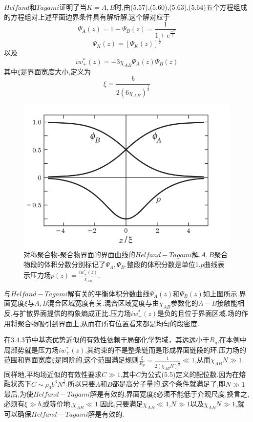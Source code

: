$Helfand$和$Tagami$证明了当$K=A,B$时,由(5.57),(5.60),(5.63),(5.64)五个方程组成的方程组对上述平面边界条件具有解析解,这个解对应于
\begin{equation}
\Psi_{A}(z)=1-\Psi_{B}(z)=\frac{1}{1+e^{\frac{-z}{\xi}}}
\end{equation}
\begin{equation}
\Psi_K(z) = [\Psi_K(z)]^{\frac{1}{2}}
\end{equation}
以及
\begin{equation}
iw_+^*(z)=-3\chi_{AB}\Psi_{A}(z)\Psi_{B}(z)
\end{equation}
其中$\xi$是界面宽度大小,定义为
\begin{equation}
\xi = \frac{b}{2(6\chi_{AB})^{\frac{1}{2}}}
\end{equation}
\begin{figure}[H]
	\centering
	\includegraphics[width=12cm]{./figures/fig5-4.png}
	\caption{对称聚合物-聚合物界面的界面曲线的$Helfand−Tagami$解.$A,B$聚合物段的体积分数分别标记了$\Psi_{A},\Psi_{B}$.整段的体积分数是单位1.$p$曲线表示压力场$p(z)=\frac{iw_+^*(z)}{\chi_{AB}}$.}
\end{figure}

与$Helfand−Tagami$解有关的平衡体积分数曲线$\Psi_{A}(z)$和$\Psi_{B}(z)$如上图所示.界面宽度$\xi$与$A,B$混合区域宽度有关.混合区域宽度与由$\chi_{AB}$参数化的$A−B$接触能相反,与扩散界面提供的构象熵成正比.压力场$iw_+^*(z)$是负的且位于界面区域.场的作用将聚合物吸引到界面上,从而在所有位置看来都是均匀的段密度.

在3.4.3节中基态优势近似的有效性依赖于局部化学势域，其远远小于$R_g$,在本例中局部势就是压力场$iw_+^*(z)$,其约束的不是整条链而是形成界面链段的环.压力场的范围和界面宽度$\xi$是同阶的,这个范围满足规则$\frac{\xi}{R_g} =\frac{1}{2(\chi_{AB}N)^{\frac{1}{2}}}\ll1$,从而$\chi_{AB}N\gg1$.同样地,平均场近似的有效性要求$C\gg1$,其中$C$为公式(5.5)定义的配位数.因为在熔融状态下$C\sim\rho_0b^3N^{\frac{1}{2}}$,所以只要$A$和$B$都是高分子量的,这个条件就满足了,即$N\gg1$.最后,为使$Helfand−Tagami$解是有效的,界面宽度$\xi $必须不能低于介观尺度.换言之,必须有$\xi \gg b$,或等价地,$\chi_{AB}\ll1$.因此,只要满足$\chi_{AB}\ll1$,$N\gg1$以及$\chi_{AB}N\gg1$,就可以确保$Helfand−Tagami$解是有效的.
	
